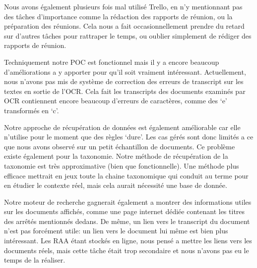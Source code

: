 Nous avons également plusieurs fois mal utilisé Trello, en n'y mentionnant pas des tâches d'importance comme la rédaction des rapports de réunion, ou la préparation des réunions.
Cela nous a fait occasionnellement prendre du retard sur d'autres tâches pour rattraper le temps, ou oublier simplement de rédiger des rapports de réunion.

Techniquement notre POC est fonctionnel mais il y a encore beaucoup d'améliorations a y apporter pour qu'il soit vraiment intéressant.
Actuellement, nous n'avons pas mis de système de correction des erreurs de transcript sur les textes en sortie de l'OCR.
Cela fait les transcripts des documents examinés par OCR contiennent encore beaucoup d'erreurs de caractères, comme des `e' transformés en `c'.

Notre approche de récupération de données est également améliorable car elle n'utilise pour le moment que des règles `dure'.
Les cas gérés sont donc limités a ce que nous avons observé sur un petit échantillon de documents.
Ce problème existe également pour la taxonomie.
Notre méthode de récupération de la taxonomie est très approximative (bien que fonctionnelle).
Une méthode plus efficace mettrait en jeux toute la chaine taxonomique qui conduit au terme pour en étudier le contexte réel, mais cela aurait nécessité une base de donnée.

Notre moteur de recherche gagnerait également a montrer des informations utiles sur les documents affichés, comme une page internet dédiée contenant les titres des arrêtés mentionnés dedans.
De même, un lien vers le transcript du document n'est pas forcément utile: un lien vers le document lui même est bien plus intéressant.
Les RAA étant stockés en ligne, nous pensé a mettre les liens vers les documents réels, mais cette tâche était trop secondaire et nous n'avons pas eu le temps de la réaliser.










